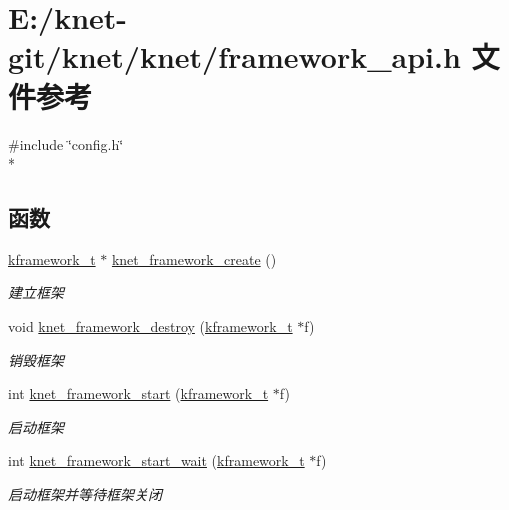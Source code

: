 \hypertarget{a00059}{}\section{E\+:/knet-\/git/knet/knet/framework\+\_\+api.h 文件参考}
\label{a00059}
{\ttfamily \#include \char`\"{}config.\+h\char`\"{}}\\*
\subsection*{函数}
\begin{DoxyCompactItemize}
\item 
\hyperlink{a00056_a3195a3be35782fc1efb920c811be111d_a3195a3be35782fc1efb920c811be111d}{kframework\+\_\+t} $\ast$ \hyperlink{a00114_ga066683c6d9defb4121552b439d11d7ba_ga066683c6d9defb4121552b439d11d7ba}{knet\+\_\+framework\+\_\+create} ()
\begin{DoxyCompactList}\small\item\em 建立框架 \end{DoxyCompactList}\item 
void \hyperlink{a00114_gaee7016dea12793dae5e6732fb86ee8d0_gaee7016dea12793dae5e6732fb86ee8d0}{knet\+\_\+framework\+\_\+destroy} (\hyperlink{a00056_a3195a3be35782fc1efb920c811be111d_a3195a3be35782fc1efb920c811be111d}{kframework\+\_\+t} $\ast$f)
\begin{DoxyCompactList}\small\item\em 销毁框架 \end{DoxyCompactList}\item 
int \hyperlink{a00114_gae2bea4af82f4cdce2f4efbf68aa8054c_gae2bea4af82f4cdce2f4efbf68aa8054c}{knet\+\_\+framework\+\_\+start} (\hyperlink{a00056_a3195a3be35782fc1efb920c811be111d_a3195a3be35782fc1efb920c811be111d}{kframework\+\_\+t} $\ast$f)
\begin{DoxyCompactList}\small\item\em 启动框架 \end{DoxyCompactList}\item 
int \hyperlink{a00114_ga5eda19f3b32bb48578cf735e877aac2e_ga5eda19f3b32bb48578cf735e877aac2e}{knet\+\_\+framework\+\_\+start\+\_\+wait} (\hyperlink{a00056_a3195a3be35782fc1efb920c811be111d_a3195a3be35782fc1efb920c811be111d}{kframework\+\_\+t} $\ast$f)
\begin{DoxyCompactList}\small\item\em 启动框架并等待框架关闭 \end{DoxyCompactList}\item 

\end{DoxyCompactItemize}
